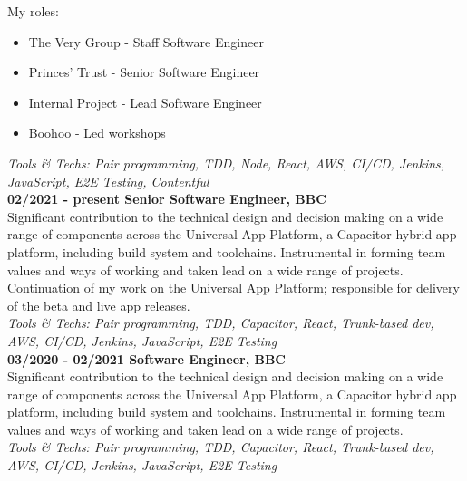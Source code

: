 My roles:\\

\begin{itemize}
  \item The Very Group   - Staff Software Engineer
  \item Princes' Trust   - Senior Software Engineer
  \item Internal Project - Lead Software Engineer
  \item Boohoo           - Led workshops
\end{itemize}

\bigskip

\emph{Tools \& Techs: Pair programming, TDD, Node, React, AWS, CI/CD, Jenkins, JavaScript, E2E Testing, Contentful}\\

\textbf{02/2021 - present \hspace{2.75em}Senior Software Engineer, BBC}\\

Significant contribution to the technical design and decision making on a wide range of components across the Universal App Platform, a Capacitor hybrid app platform, including build system and toolchains. Instrumental in forming team values and ways of working and taken lead on a wide range of projects.\\

Continuation of my work on the Universal App Platform; responsible for delivery of the beta and live app releases.\\

\emph{Tools \& Techs: Pair programming, TDD, Capacitor, React, Trunk-based dev, AWS, CI/CD, Jenkins, JavaScript, E2E Testing}\\

\textbf{03/2020 - 02/2021 \hspace{2.75em}Software Engineer, BBC}\\

Significant contribution to the technical design and decision making on a wide range of components across the Universal App Platform, a Capacitor hybrid app platform, including build system and toolchains. Instrumental in forming team values and ways of working and taken lead on a wide range of projects.\\

\emph{Tools \& Techs: Pair programming, TDD, Capacitor, React, Trunk-based dev, AWS, CI/CD, Jenkins, JavaScript, E2E Testing}\\

